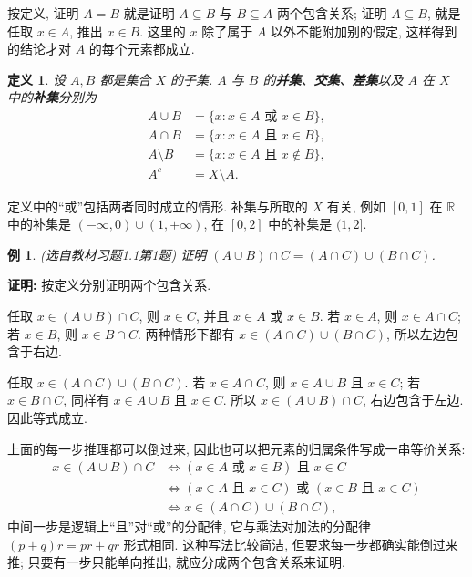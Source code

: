 \documentclass[UTF8,openany]{ctexbook}
\theoremstyle{chinesetextbook}
\newtheorem{definition}{定义}[section]
\newtheorem{example}{例}[section]
\newenvironment{cnproof}{\par\indent\textbf{证明:} \ignorespaces}{\par}
\begin{document}
按定义, 证明 $A=B$ 就是证明 $A\subseteq B$ 与 $B\subseteq A$ 两个包含关系; 证明 $A\subseteq B$, 就是任取 $x\in A$, 推出 $x\in B$. 这里的 $x$ 除了属于 $A$ 以外不能附加别的假定, 这样得到的结论才对 $A$ 的每个元素都成立.
\begin{definition}
设 $A,B$ 都是集合 $X$ 的子集. $A$ 与 $B$ 的\textbf{并集}、\textbf{交集}、\textbf{差集}以及 $A$ 在 $X$ 中的\textbf{补集}分别为
\[
\begin{aligned}
A\cup B&=\{x:x\in A\text{ 或 }x\in B\},\\
A\cap B&=\{x:x\in A\text{ 且 }x\in B\},\\
A\setminus B&=\{x:x\in A\text{ 且 }x\notin B\},\\
A^c&=X\setminus A.
\end{aligned}
\]
\end{definition}
定义中的“或”包括两者同时成立的情形. 补集与所取的 $X$ 有关, 例如 $[0,1]$ 在 $\mathbb R$ 中的补集是 $(-\infty,0)\cup(1,+\infty)$, 在 $[0,2]$ 中的补集是 $(1,2]$.
\begin{example}
\textnormal{(选自教材习题1.1第1题)} 证明 $(A\cup B)\cap C=(A\cap C)\cup(B\cap C)$.
\end{example}
\begin{cnproof}
按定义分别证明两个包含关系.

任取 $x\in(A\cup B)\cap C$, 则 $x\in C$, 并且 $x\in A$ 或 $x\in B$. 若 $x\in A$, 则 $x\in A\cap C$; 若 $x\in B$, 则 $x\in B\cap C$. 两种情形下都有 $x\in(A\cap C)\cup(B\cap C)$, 所以左边包含于右边.

任取 $x\in(A\cap C)\cup(B\cap C)$. 若 $x\in A\cap C$, 则 $x\in A\cup B$ 且 $x\in C$; 若 $x\in B\cap C$, 同样有 $x\in A\cup B$ 且 $x\in C$. 所以 $x\in(A\cup B)\cap C$, 右边包含于左边. 因此等式成立.
\end{cnproof}
上面的每一步推理都可以倒过来, 因此也可以把元素的归属条件写成一串等价关系:
\[
\begin{aligned}
x\in(A\cup B)\cap C
&\iff (x\in A\text{ 或 }x\in B)\text{ 且 }x\in C\\
&\iff (x\in A\text{ 且 }x\in C)\text{ 或 }(x\in B\text{ 且 }x\in C)\\
&\iff x\in(A\cap C)\cup(B\cap C),
\end{aligned}
\]
中间一步是逻辑上“且”对“或”的分配律, 它与乘法对加法的分配律 $(p+q)r=pr+qr$ 形式相同. 这种写法比较简洁, 但要求每一步都确实能倒过来推; 只要有一步只能单向推出, 就应分成两个包含关系来证明.
\end{document}
